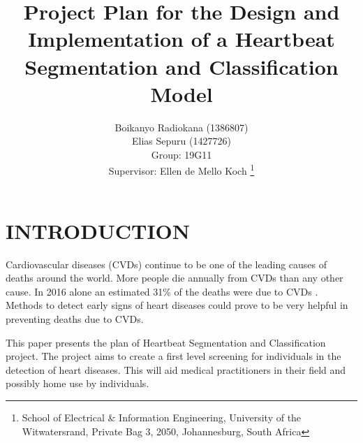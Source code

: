 \documentclass[10pt,twocolumn]{witseiepaper}
\begin{document}
\title{Project Plan for the Design and Implementation of a Heartbeat Segmentation and Classification Model}

\author{Boikanyo Radiokana (1386807) \\ Elias Sepuru (1427726) \\ Group: 19G11 \\Supervisor: Ellen de Mello Koch
\thanks{School of Electrical \& Information Engineering, University of the
Witwatersrand, Private Bag 3, 2050, Johannesburg, South Africa}
}


%



\maketitle
\thispagestyle{empty}\pagestyle{empty}


%
\section{INTRODUCTION}
Cardiovascular diseases (CVDs) continue to be one of the leading causes of deaths around the world. More people die annually from CVDs than  any other cause. In 2016 alone an estimated 31\% of the deaths were due to CVDs \cite{WHO}. Methods to detect early signs of heart diseases could prove to be very helpful in preventing deaths due to CVDs. 

This paper presents the plan of Heartbeat Segmentation and Classification project. The project aims to create a first level screening for individuals in the detection of heart diseases. This will aid medical practitioners in their field and possibly home use by individuals.
\end{document}
